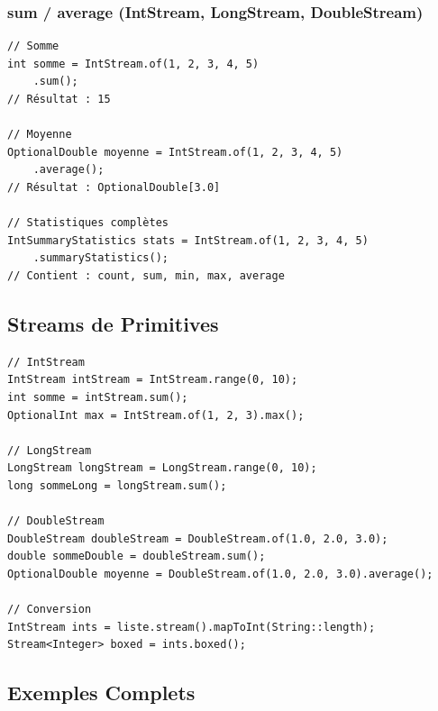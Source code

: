 \documentclass[11pt,a4paper]{article}
\begin{document}
\subsubsection{sum / average (IntStream, LongStream, DoubleStream)}

\begin{lstlisting}
// Somme
int somme = IntStream.of(1, 2, 3, 4, 5)
    .sum();
// Résultat : 15

// Moyenne
OptionalDouble moyenne = IntStream.of(1, 2, 3, 4, 5)
    .average();
// Résultat : OptionalDouble[3.0]

// Statistiques complètes
IntSummaryStatistics stats = IntStream.of(1, 2, 3, 4, 5)
    .summaryStatistics();
// Contient : count, sum, min, max, average
\end{lstlisting}

\subsection{Streams de Primitives}

\begin{lstlisting}
// IntStream
IntStream intStream = IntStream.range(0, 10);
int somme = intStream.sum();
OptionalInt max = IntStream.of(1, 2, 3).max();

// LongStream
LongStream longStream = LongStream.range(0, 10);
long sommeLong = longStream.sum();

// DoubleStream
DoubleStream doubleStream = DoubleStream.of(1.0, 2.0, 3.0);
double sommeDouble = doubleStream.sum();
OptionalDouble moyenne = DoubleStream.of(1.0, 2.0, 3.0).average();

// Conversion
IntStream ints = liste.stream().mapToInt(String::length);
Stream<Integer> boxed = ints.boxed();
\end{lstlisting}

\subsection{Exemples Complets}
\end{document}
